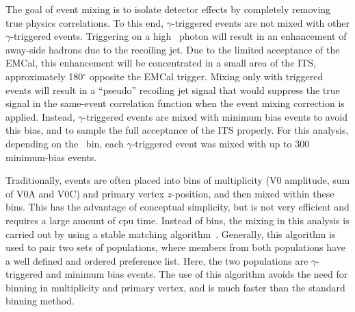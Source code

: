 
The goal of event mixing is to isolate detector effects by completely removing true physics correlations. To this end, $\gamma$-triggered events are not mixed with other $\gamma$-triggered events. Triggering on a high \pt~photon will result in an enhancement of away-side hadrons due to the recoiling jet. Due to the limited acceptance of the EMCal, this enhancement will be concentrated in a small area of the ITS, approximately 180$^{\circ}$ opposite the EMCal trigger. Mixing only with triggered events will result in a ``pseudo'' recoiling jet signal that would suppress the true signal in the same-event correlation function when the event mixing correction is applied. Instead, $\gamma$-triggered events are mixed with minimum bias events to avoid this bias, and to sample the full acceptance of the ITS properly. For this analysis, depending on the \zt~bin, each \(\gamma\)-triggered event was mixed with up to 300 minimum-bias events.






Traditionally, events are often placed into bins of multiplicity (V0 amplitude, sum of V0A and V0C) and primary vertex $z$-position, and then mixed within these bins. This has the advantage of conceptual simplicity, but is not very efficient and requires a large amount of cpu time. Instead of bins, the mixing in this analysis is carried out by using a stable matching algorithm~\cite{GALE1985223}. Generally, this algorithm is used to pair two sets of populations, where members from both populations have a well defined and ordered preference list. Here, the two populations are $\gamma$-triggered and minimum bias events. The use of this algorithm avoids the need for binning in multiplicity and primary vertex, and is much faster than the standard binning method.

